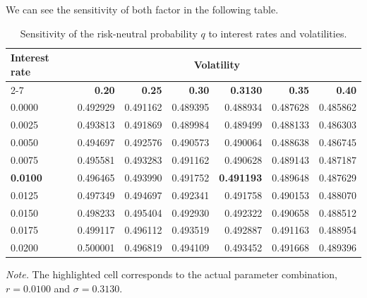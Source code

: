 \documentclass[12pt, a4paper]{article}
\begin{document}
\noindent We can see the sensitivity of both factor in the following table.
\vspace{1em}

\begin{table}[H]
  \centering
  \caption{Sensitivity of the risk-neutral probability \(q\) to interest rates and volatilities.}
  \label{tab:sensitivity_rates_volatility}

  \small
  \setlength{\tabcolsep}{6pt}
  \renewcommand{\arraystretch}{1.15}

  \begin{tabular}{lrrr>{\columncolor{gray!10}}rrr}
    \toprule
    \textbf{Interest rate}
    & \multicolumn{6}{c}{\textbf{Volatility}} \\
    \cmidrule(lr){2-7}
    & {\textbf{0.20}}
    & {\textbf{0.25}}
    & {\textbf{0.30}}
    & {\cellcolor{gray!10}\textbf{0.3130}}
    & {\textbf{0.35}}
    & {\textbf{0.40}} \\
    \midrule
    0.0000 & 0.492929 & 0.491162 & 0.489395 & 0.488934 & 0.487628 & 0.485862 \\
    0.0025 & 0.493813 & 0.491869 & 0.489984 & 0.489499 & 0.488133 & 0.486303 \\
    0.0050 & 0.494697 & 0.492576 & 0.490573 & 0.490064 & 0.488638 & 0.486745 \\
    0.0075 & 0.495581 & 0.493283 & 0.491162 & 0.490628 & 0.489143 & 0.487187 \\

    \rowcolor{gray!10}
    \textbf{0.0100}
    & 0.496465
    & 0.493990
    & 0.491752
    & \cellcolor{gray!25}\textbf{0.491193}
    & 0.489648
    & 0.487629 \\

    0.0125 & 0.497349 & 0.494697 & 0.492341 & 0.491758 & 0.490153 & 0.488070 \\
    0.0150 & 0.498233 & 0.495404 & 0.492930 & 0.492322 & 0.490658 & 0.488512 \\
    0.0175 & 0.499117 & 0.496112 & 0.493519 & 0.492887 & 0.491163 & 0.488954 \\
    0.0200 & 0.500001 & 0.496819 & 0.494109 & 0.493452 & 0.491668 & 0.489396 \\
    \bottomrule
  \end{tabular}

  \vspace{2mm}
  \begin{minipage}{0.92\textwidth}
    \footnotesize
    \textit{Note.} The highlighted cell corresponds to the actual parameter combination,
    \(r = 0.0100\) and \(\sigma = 0.3130\).
  \end{minipage}
\end{table}
\vspace{2.5em}
\end{document}
